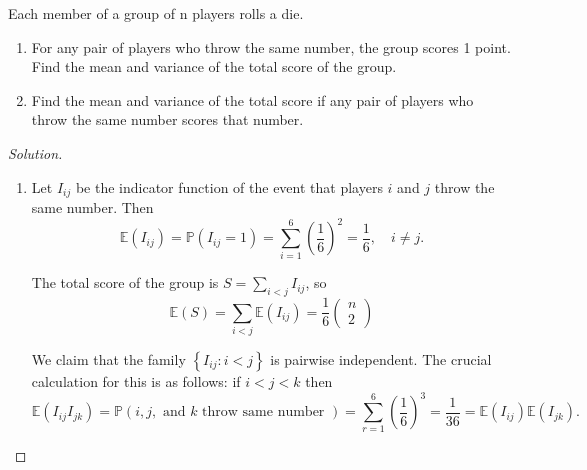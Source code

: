 \documentclass[11pt,singlecolumn, openany, citestyle=authoryear]{elegantbook}
\begin{document}
\begin{CJK}{UTF8}{gbsn}
\begin{exercise}
    Each member of a group of n players rolls a die.
\begin{enumerate}

    \item For any pair of players who throw the same number, the group scores 1 point. Find the mean and
variance of the total score of the group.
    \item Find the mean and variance of the total score if any pair of players who throw the same number
scores that number.
\end{enumerate}
\end{exercise}
\begin{proof}[Solution]
    \begin{enumerate}
        \item Let $I_{i j}$ be the indicator function of the event that players $i$ and $j$ throw the same number. Then
        $$
        \mathbb{E}\left(I_{i j}\right)=\mathbb{P}\left(I_{i j}=1\right)=\sum_{i=1}^6\left(\frac{1}{6}\right)^2=\frac{1}{6}, \quad i \neq j .
        $$
        
        The total score of the group is $S=\sum_{i<j} I_{i j}$, so
        $$
        \mathbb{E}(S)=\sum_{i<j} \mathbb{E}\left(I_{i j}\right)=\frac{1}{6}\left(\begin{array}{l}
        n \\
        2
        \end{array}\right)
        $$
        
        We claim that the family $\left\{I_{i j}: i<j\right\}$ is pairwise independent. The crucial calculation for this is as follows: if $i<j<k$ then
        $$
        \mathbb{E}\left(I_{i j} I_{j k}\right)=\mathbb{P}(i, j, \text { and } k \text { throw same number })=\sum_{r=1}^6\left(\frac{1}{6}\right)^3=\frac{1}{36}=\mathbb{E}\left(I_{i j}\right) \mathbb{E}\left(I_{j k}\right) .
        $$
        

\end{enumerate}
\end{proof}
\end{CJK}
\end{document}

